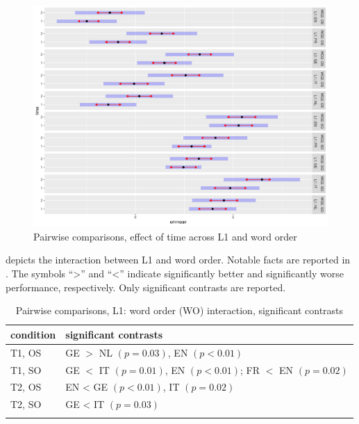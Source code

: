 \begin{figure}[p]
    \includegraphics[height=.4\textheight]{figures/05-3.pdf}
    \caption{Pairwise comparisons, effect of time across L1 and word order}
    \label{fig:05:3}
\end{figure}

 depicts the interaction between L1 and word order. Notable facts are reported in . The symbols “>” and “<” indicate significantly better and significantly worse performance, respectively. Only significant contrasts are reported.

\begin{table}
    \begin{tabularx}{\textwidth}{XX}
    \lsptoprule
    condition & significant contrasts\\
    \midrule
    T1, OS & GE $>$ NL $(p = 0.03)$, EN $(p < 0.01)$\\
    \tablevspace
    T1, SO & GE $<$ IT $(p = 0.01)$, EN $(p < 0.01)$;\newline
            FR $<$ EN $(p = 0.02)$\\
    \tablevspace
    T2, OS & EN < GE $(p < 0.01)$, IT $(p = 0.02)$\\
    \tablevspace
    T2, SO & GE < IT $(p = 0.03)$\\
    \lspbottomrule
    \end{tabularx}
    \caption{Pairwise comparisons, L1: word order (WO) interaction, significant contrasts}
    \label{tab:05:5}
\end{table}

